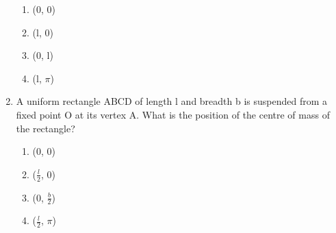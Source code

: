 \begin{enumerate}
\begin{enumerate}
    \item (0, 0)
    \item (l, 0)
    \item (0, l)
    \item (l, $\pi$)
\end{enumerate}

\item A uniform rectangle ABCD of length l and breadth b is suspended from a fixed point O at its vertex A. What is the position of the centre of mass of the rectangle?

\begin{enumerate}
    \item (0, 0)
    \item ($\frac{l}{2}$, 0)
    \item (0, $\frac{b}{2}$)
    \item ($\frac{l}{2}$, $\pi$)
\end{enumerate}

\end{enumerate}

